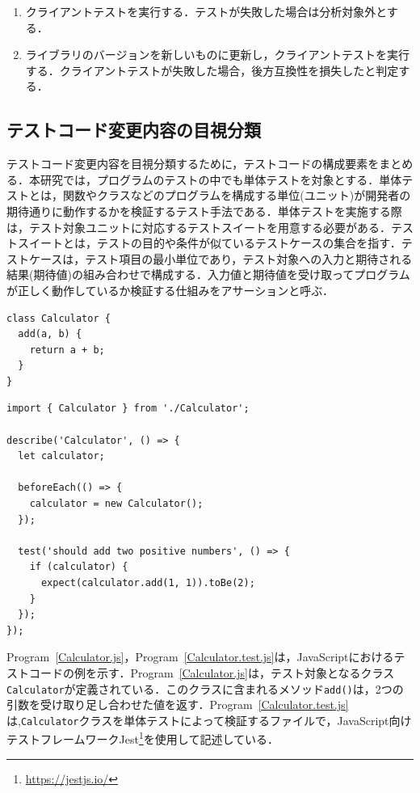 \documentclass[11pt,dvipdfmx]{jreport}
\begin{document}
\begin{enumerate}
  \item クライアントテストを実行する．テストが失敗した場合は分析対象外とする．
  \item ライブラリのバージョンを新しいものに更新し，クライアントテストを実行する．クライアントテストが失敗した場合，後方互換性を損失したと判定する．
\end{enumerate}

\subsection{テストコード変更内容の目視分類}
テストコード変更内容を目視分類するために，テストコードの構成要素をまとめる．本研究では，プログラムのテストの中でも単体テストを対象とする．単体テストとは，関数やクラスなどのプログラムを構成する単位(ユニット)が開発者の期待通りに動作するかを検証するテスト手法である．単体テストを実施する際は，テスト対象ユニットに対応するテストスイートを用意する必要がある．テストスイートとは，テストの目的や条件が似ているテストケースの集合を指す．テストケースは，テスト項目の最小単位であり，テスト対象への入力と期待される結果(期待値)の組み合わせで構成する．入力値と期待値を受け取ってプログラムが正しく動作しているか検証する仕組みをアサーションと呼ぶ．

\begin{lstlisting}[caption=Calculator.js, label=Calculator.js]
class Calculator {
  add(a, b) {
    return a + b;
  }
}
\end{lstlisting}

\begin{lstlisting}[caption=Calculator.test.js, label=Calculator.test.js]
import { Calculator } from './Calculator';

describe('Calculator', () => {
  let calculator;

  beforeEach(() => {
    calculator = new Calculator();
  });

  test('should add two positive numbers', () => {
    if (calculator) {
      expect(calculator.add(1, 1)).toBe(2);
    }
  });
});
\end{lstlisting}


Program~\ref{Calculator.js}，Program~\ref{Calculator.test.js}は，JavaScriptにおけるテストコードの例を示す．Program~\ref{Calculator.js}は，テスト対象となるクラス{\verb|Calculator|}が定義されている．このクラスに含まれるメソッド{\verb|add()|}は，2つの引数を受け取り足し合わせた値を返す．Program~\ref{Calculator.test.js}は,{\verb|Calculator|}クラスを単体テストによって検証するファイルで，JavaScript向けテストフレームワークJest\footnote{\url{https://jestjs.io/}}を使用して記述している．
\end{document}
